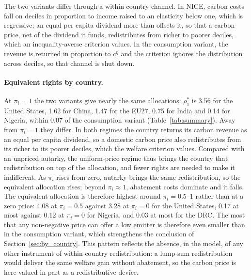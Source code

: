 \documentclass[12pt,english]{article}
\theoremstyle{remark}
\begin{document}
The two variants differ through a within-country channel. In NICE, carbon costs fall on deciles in proportion to income raised to an elasticity below one, which is regressive; an equal per capita dividend more than offsets it, so that a carbon price, net of the dividend it funds, redistributes from richer to poorer deciles, which an inequality-averse criterion values. In the consumption variant, the revenue is returned in proportion to $c^{\eta}$ and the criterion ignores the distribution across deciles, so that channel is shut down.

\paragraph{Equivalent rights by country.} At $\pi_i=1$ the two variants give nearly the same allocations: $\rho^*_1$ is 3.56 for the United States, 1.62 for China, 1.47 for the EU27, 0.75 for India and 0.14 for Nigeria, within 0.07 of the consumption variant (Table~\ref{tab:summary}). Away from $\pi_i=1$ they differ. In both regimes the country returns its carbon revenue as an equal per capita dividend, so a domestic carbon price also redistributes from its richer to its poorer deciles, which the welfare criterion values. Compared with an unpriced autarky, the uniform-price regime thus brings the country that redistribution on top of the allocation, and fewer rights are needed to make it indifferent. As $\pi_i$ rises from zero, autarky brings the same redistribution, so the equivalent allocation rises; beyond $\pi_i\approx1$, abatement costs dominate and it falls. The equivalent allocation is therefore highest around $\pi_i=0.5$--$1$ rather than at a zero price: 4.08 at $\pi_i=0.5$ against 3.28 at $\pi_i=0$ for the United States, 0.17 at most against 0.12 at $\pi_i=0$ for Nigeria, and 0.03 at most for the DRC. The most that any non-negative price can offer a low emitter is therefore even smaller than in the consumption variant, which strengthens the conclusion of Section~\ref{sec:by_country}. This pattern reflects the absence, in the model, of any other instrument of within-country redistribution: a lump-sum redistribution would deliver the same welfare gain without abatement, so the carbon price is here valued in part as a redistributive device.
\end{document}
